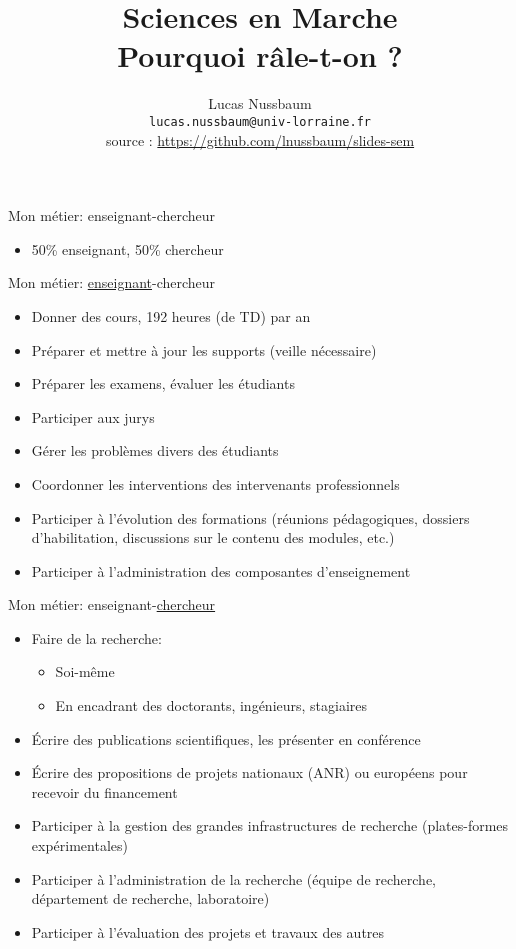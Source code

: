 \documentclass[10pt,final,usepdftitle=false]{beamer}
\title[Sciences en Marche]{Sciences en Marche\\[0.5em]Pourquoi râle-t-on ?}
\author[Lucas Nussbaum]{Lucas Nussbaum\\[0.5em] \small  \texttt{lucas.nussbaum@univ-lorraine.fr}\\[0.5em]
source : \url{https://github.com/lnussbaum/slides-sem}}
\date{}
\begin{document}
\frame{\titlepage}

\begin{frame}{Mon métier: enseignant-chercheur}
\begin{itemize}
\item 50\% enseignant, 50\% chercheur
\end{itemize}
\end{frame}

\begin{frame}{Mon métier: \underline{enseignant}-chercheur}
\begin{itemize}
\item Donner des cours, 192 heures (de TD) par an
\item Préparer et mettre à jour les supports (veille nécessaire)
\item Préparer les examens, évaluer les étudiants
\item Participer aux jurys
\item Gérer les problèmes divers des étudiants
\item Coordonner les interventions des intervenants professionnels
\item Participer à l'évolution des formations (réunions pédagogiques, dossiers d'habilitation, discussions sur le contenu des modules, etc.)
\item Participer à l'administration des composantes d'enseignement
\end{itemize}
\end{frame}

\begin{frame}{Mon métier: enseignant-\underline{chercheur}}
\begin{itemize}
\item Faire de la recherche:
	\begin{itemize}
		\item Soi-même
		\item En encadrant des doctorants, ingénieurs, stagiaires
	\end{itemize}
	\smallskip
\item Écrire des publications scientifiques, les présenter en conférence
\item Écrire des propositions de projets nationaux (ANR) ou européens pour recevoir du financement
\item Participer à la gestion des grandes infrastructures de recherche (plates-formes expérimentales)
\item Participer à l'administration de la recherche (équipe de recherche, département de recherche, laboratoire)
\item Participer à l'évaluation des projets et travaux des autres
\end{itemize}
\end{frame}
\end{document}
